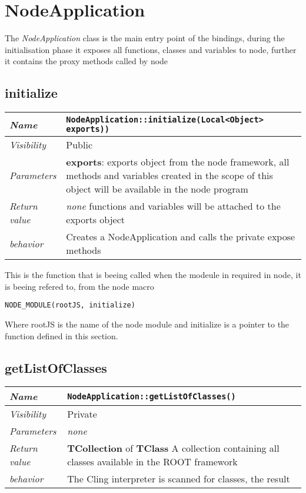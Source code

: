 \chapter{NodeApplication}
The \textit{NodeApplication} class is the main entry point of the bindings, during the initialisation phase it exposes all functions, classes and variables to node, further it contains the proxy methods called by node
\section{initialize}
\begin{longtable}{p{3cm} @{\hskip 1cm} p{12cm}}
  \hline
  \textit{Name} & \texttt{NodeApplication::initialize(Local<Object> exports))} \\
  \hline
  \textit{Visibility} & Public \\
  \hline
  \textit{Parameters} & \textbf{exports}: exports object from the node framework, all methods and variables created in the scope of this object will be available in the node program \\
  \hline
  \textit{Return value} & \textit{none} functions and variables will be attached to the exports object \\
  \hline
  \textit{behavior} & Creates a NodeApplication and calls the private expose methods \\
  \hline
\end{longtable}
This is the function that is beeing called when the modeule in required in node, it is beeing refered to, from the node macro
\begin{verbatim}
NODE_MODULE(rootJS, initialize)
\end{verbatim}
Where rootJS is the name of the node module and initialize is a pointer to the function defined in this section.
\newpage

\section{getListOfClasses}
\begin{longtable}{p{3cm} @{\hskip 1cm} p{12cm}}
  \hline
  \textit{Name} & \texttt{NodeApplication::getListOfClasses()} \\
  \hline
  \textit{Visibility} & Private \\
  \hline
  \textit{Parameters} & \textit{none} \\
  \hline
  \textit{Return value} & \textbf{TCollection} of \textbf{TClass} A collection containing all classes available in the ROOT framework \\
  \hline
  \textit{behavior} & The Cling interpreter is scanned for classes, the result \\
  \hline
\end{longtable}

